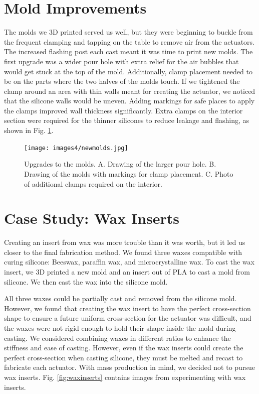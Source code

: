 \clearpage
\section{Mold Improvements}
The molds we 3D printed served us well, but they were beginning to buckle from the frequent clamping and tapping on the table to remove air from the actuators. The increased flashing post each cast meant it was time to print new molds. The first upgrade was a wider pour hole with extra relief for the air bubbles that would get stuck at the top of the mold. Additionally, clamp placement needed to be on the parts where the two halves of the molds touch. If we tightened the clamp around an area with thin walls meant for creating the actuator, we noticed that the silicone walls would be uneven. Adding markings for safe places to apply the clamps improved wall thickness significantly. Extra clamps on the interior section were required for the thinner silicones to reduce leakage and flashing, as shown in Fig. \ref{fig:newmolds}.

\begin{figure}[h]
    \centering
    \texttt{[image: images4/newmolds.jpg]}
    \caption{Upgrades to the molds. A. Drawing of the larger pour hole. B. Drawing of the molds with markings for clamp placement. C. Photo of additional clamps required on the interior.}
    \label{fig:newmolds}
\end{figure}

\clearpage
\section{Case Study: Wax Inserts}
Creating an insert from wax was more trouble than it was worth, but it led us closer to the final fabrication method. We found three waxes compatible with curing silicone: Beeswax, paraffin wax, and microcrystalline wax. To cast the wax insert, we 3D printed a new mold and an insert out of PLA to cast a mold from silicone. We then cast the wax into the silicone mold. 

All three waxes could be partially cast and removed from the silicone mold. However, we found that creating the wax insert to have the perfect cross-section shape to ensure a future uniform cross-section for the actuator was difficult, and the waxes were not rigid enough to hold their shape inside the mold during casting. We considered combining waxes in different ratios to enhance the stiffness and ease of casting. However, even if the wax inserts could create the perfect cross-section when casting silicone, they must be melted and recast to fabricate each actuator. With mass production in mind, we decided not to pursue wax inserts. Fig. \ref{fig:waxinserts} contains images from experimenting with wax inserts. 

